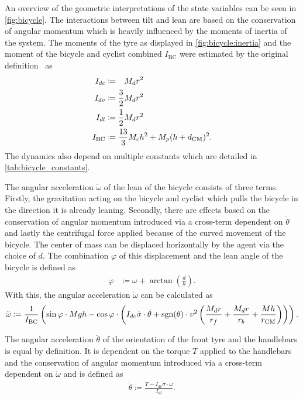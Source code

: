 An overview of the geometric interpretations of the state variables can be seen in \cref{fig:bicycle}.
The interactions between tilt and lean are based on the conservation of angular momentum which is heavily influenced by the moments of inertia of the system.
The moments of the tyre as displayed in \cref{fig:bicycle:inertia} and the moment of the bicycle and cyclist combined $I_{\text{BC}}$ were estimated by the original definition~\cite{randlov_learning_1998} as
\begin{align}
    I_{dc} &\coloneqq \hphantom{\frac{1}{2}}M_d r^2\\
    I_{dv} &\coloneqq \frac{3}{2}M_d r^2\\
    I_{dl} &\coloneqq \frac{1}{2}M_d r^2\\
    I_{\text{BC}} &\coloneqq \frac{13}{3} M_c h^2 + M_p(h + d_\CM)^2.
\end{align}
The dynamics also depend on multiple constants which are detailed in \cref{tab:bicycle_constants}.

The angular acceleration $\ddot{\omega}$ of the lean of the bicycle consists of three terms.
Firstly, the gravitation acting on the bicycle and cyclist which pulls the bicycle in the direction it is already leaning.
Secondly, there are effects based on the conservation of angular momentum introduced via a cross-term dependent on  $\dot{\theta}$ and lastly the centrifugal force applied because of the curved movement of the bicycle.
The center of mass can be displaced horizontally by the agent via the choice of $d$.
The combination $\varphi$ of this displacement and the lean angle of the bicycle is defined as
\begin{align}
    \varphi &\coloneqq \omega + \arctan \left( \frac{d}{h} \right).
\end{align}
With this, the angular acceleration $\ddot{\omega}$ can be calculated as
\begin{align}
    \ddot{\omega} \coloneqq \frac{1}{I_{\text{BC}}} \left(
        \sin \varphi \cdot Mgh - \cos \varphi \cdot \left(
            I_{dc}\dot{\sigma}\cdot\dot{\theta} +
            \operatorname{sgn}(\theta) \cdot v^2 \left(
                \frac{M_dr}{r_f} + \frac{M_d r}{r_b} + \frac{Mh}{r_{\text{CM}}}
            \right)
        \right)
    \right).
\end{align}

The angular acceleration $\ddot{\theta}$ of the orientation of the front tyre and the handlebars is equal by definition.
It is dependent on the torque $T$ applied to the handlebars and the conservation of angular momentum introduced via a cross-term dependent on $\dot{\omega}$ and is defined as
\begin{align}
    \ddot{\theta} \coloneqq \frac{T - I_{dv}\dot{\sigma}\cdot\dot{\omega}}{I_{dl}}.
\end{align}

